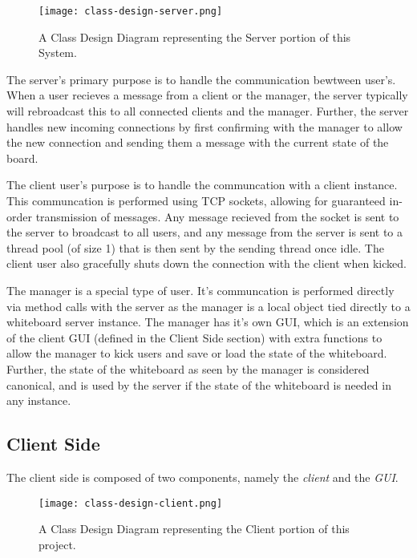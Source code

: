 \documentclass[12pt]{article}
\begin{document}
\begin{figure}[ht]
  \centering
  \texttt{[image: class-design-server.png]}
  \caption{A Class Design Diagram representing the Server portion of this System.}
  \label{fig:server}
\end{figure}

The server's primary purpose is to handle the communication bewtween user's. When a user recieves a message from a client or the manager, the server typically will rebroadcast this to all connected clients and the manager. Further, the server handles new incoming connections by first confirming with the manager to allow the new connection and sending them a message with the current state of the board.

The client user's purpose is to handle the communcation with a client instance. This communcation is performed using TCP sockets, allowing for guaranteed in-order transmission of messages. Any message recieved from the socket is sent to the server to broadcast to all users, and any message from the server is sent to a thread pool (of size 1) that is then sent by the sending thread once idle. The client user also gracefully shuts down the connection with the client when kicked. 

The manager is a special type of user. It's communcation is performed directly via method calls with the server as the manager is a local object tied directly to a whiteboard server instance. The manager has it's own GUI, which is an extension of the client GUI (defined in the Client Side section) with extra functions to allow the manager to kick users and save or load the state of the whiteboard. Further, the state of the whiteboard as seen by the manager is considered canonical, and is used by the server if the state of the whiteboard is needed in any instance. 

\newpage

\subsection{Client Side}
The client side is composed of two components, namely the \textit{client} and the \textit{GUI}.

\begin{figure}[ht]
  \centering
  \texttt{[image: class-design-client.png]}
  \caption{A Class Design Diagram representing the Client portion of this project.}
  \label{fig:client}
\end{figure}
\end{document}
